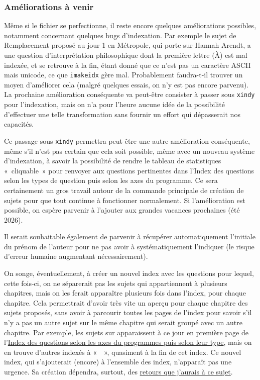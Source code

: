\subsubsection{Améliorations à venir}

Même si le fichier se perfectionne, il reste encore quelques améliorations possibles, notamment concernant quelques bugs d'indexation. Par exemple le sujet de Remplacement proposé au jour 1 en Métropole, qui porte sur Hannah Arendt, a une question d'interprétation philosophique dont la première lettre (À) est mal indexée, et se retrouve à la fin, étant donné que ce n'est pas un caractère ASCII mais unicode, ce que \texttt{imakeidx} gère mal. Probablement faudra-t-il trouver un moyen d'améliorer cela (malgré quelques essais, on n'y est pas encore parvenu). La prochaine amélioration conséquente va peut-être consister à passer sous \texttt{xindy} pour l'indexation, mais on n'a pour l'heure aucune idée de la possibilité d'effectuer une telle transformation sans fournir un effort qui dépasserait nos capacités.

Ce passage sous \texttt{xindy} permettra peut-être une autre amélioration conséquente, même s'il n'est pas certain que cela soit possible, même avec un nouveau système d'indexation, à savoir la possibilité de rendre le tableau de statistiques «~cliquable~» pour renvoyer aux questions pertinentes dans l'Index des questions selon les types de question puis selon les axes du programme. Ce sera certainement un gros travail autour de la commande principale de création de sujets pour que tout continue à fonctionner normalement. Si l'amélioration est possible, on espère parvenir à l'ajouter aux grandes vacances prochaines (été 2026).

Il serait souhaitable également de parvenir à récupérer automatiquement l'initiale du prénom de l'auteur pour ne pas avoir à systématiquement l'indiquer (le risque d'erreur humaine augmentant nécessairement).

On songe, éventuellement, à créer un nouvel index avec les questions pour lequel, cette fois-ci, on ne séparerait pas les sujets qui appartiennent à plusieurs chapitres, mais on les ferait apparaître plusieurs fois dans l'index, pour chaque chapitre. Cela permettrait d'avoir très vite un aperçu pour chaque chapitre des sujets proposés, sans avoir à parcourir toutes les pages de l'index pour savoir s'il n'y a pas un autre sujet sur le même chapitre qui serait groupé avec un autre chapitre. Par exemple, les sujets sur \ETA{} apparaissent à ce jour en première page de l'\hyperlink{indexw}{Index des questions selon les axes du programmes puis selon leur type}, mais on en trouve d'autres indexés à «~\EXSTA{}~», quasiment à la fin de cet index. Ce nouvel index, qui s'ajouterait (encore) à l'ensemble des index, n'apparaît pas une urgence. Sa création dépendra, surtout, des \href{mailto:mikael.quesseveur@ac-lille.fr}{retours que j'aurais à ce sujet}.

